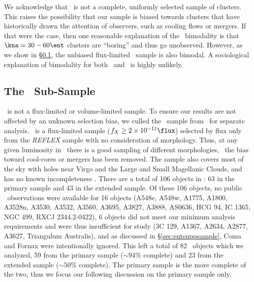 We acknowledge that \accept\ is not a complete, uniformly selected
sample of clusters. This raises the possibility that our sample is
biased towards clusters that have historically drawn the attention of
observers, such as cooling flows or mergers. If that were the case,
then one reasonable explanation of the \kna\ bimodality is that $\kna
= 30-60 \ent$ clusters are ``boring'' and thus go unobserved. However,
as we show in \S\ref{sec:entsupphifl}, the unbiased flux-limited
\hifl\ sample is also bimodal. A sociological explanation of
bimodality for both \accept\ and \hifl\ is highly unlikely.

\subsection{The \hifl\ Sub-Sample}
\label{sec:entsupphifl}

\accept\ is not a flux-limited or volume-limited sample. To ensure our
results are not affected by an unknown selection bias, we culled the
\hifl\ sample from \accept\ for separate analysis. \hifl\ is a
flux-limited sample ($f_X \ge 2 \times 10^{-11} \flux$) selected by
flux only from the {\it{REFLEX}} sample \citep{reflex} with no
consideration of morphology. Thus, at any given luminosity in
\hifl\ there is a good sampling of different morphologies, \ie\ the
bias toward cool-cores or mergers has been removed. The sample also
covers most of the sky with holes near Virgo and the Large and Small
Magellanic Clouds, and has no known incompleteness
\citep{2007A&A...466..805C}. There are a total of 106 objects in
\hifl: 63 in the primary sample and 43 in the extended sample. Of
these 106 objects, no public \chandra\ observations were available for
16 objects (A548e, A548w, A1775, A1800, A3528n, A3530, A3532, A3560,
A3695, A3827, A3888, AS0636, HCG 94, IC 1365, NGC 499, RXCJ
2344.2-0422), 6 objects did not meet our minimum analysis requirements
and were thus insufficient for study (3C 129, A1367, A2634, A2877,
A3627, Triangulum Australis), and as discussed in \S\ref{sec:entsuppsample},
Coma and Fornax were intentionally ignored. This left a total of 82
\hifl\ objects which we analyzed, 59 from the primary sample ($\sim
94\%$ complete) and 23 from the extended sample ($\sim 50\%$
complete). The primary sample is the more complete of the two, thus we
focus our following discussion on the primary sample only.

